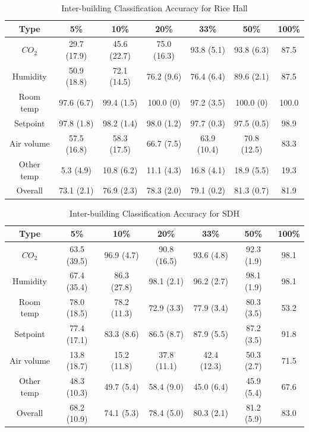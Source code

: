 \begin{table}[ht!]
\caption{Inter-building Classification Accuracy for Rice Hall}
\centering %
\begin{tabular}{c | c | c | c | c | c | c}%
\hline %
Type & 5\% & 10\% & 20\% & 33\% & 50\% & 100\% \\ %
\hline\hline %
$CO_{2}$ & 29.7 (17.9) & 45.6 (22.7) & 75.0 (16.3) & 93.8 (5.1) & 93.8 (6.3) & 87.5\\ \hline
Humidity & 50.9 (18.8) & 72.1 (14.5) & 76.2 (9.6) & 76.4 (6.4) & 89.6 (2.1) & 87.5\\ \hline
Room temp & 97.6 (6.7) & 99.4 (1.5) & 100.0 (0) & 97.2 (3.5) & 100.0 (0) & 100.0\\ \hline
Setpoint & 97.8 (1.8) & 98.2 (1.4) & 98.0 (1.2) & 97.7 (0.3) & 97.5 (0.5) & 98.9\\ \hline
Air volume & 57.5 (16.8) & 58.3 (17.5) & 66.7 (7.5) & 63.9 (10.4) & 70.8 (12.5) & 83.3\\ \hline
Other temp & 5.3 (4.9) & 10.8 (6.2) & 11.1 (4.3) & 16.8 (4.1) & 18.9 (5.5) & 19.3\\ \hline
Overall & 73.1 (2.1) & 76.9 (2.3) & 78.3 (2.0) & 79.1 (0.2) & 81.3 (0.7) & 81.9\\ \hline
\end{tabular}
\label{table:rice_x} %
\end{table}

\begin{table}[ht!]
\caption{Inter-building Classification Accuracy for SDH}
\centering %
\begin{tabular}{c | c | c | c | c | c | c} \hline
Type & 5\% & 10\% & 20\% & 33\% & 50\% & 100\%\\ %
\hline\hline %
$CO_{2}$ & 63.5 (39.5) & 96.9 (4.7) & 90.8 (16.5) & 93.6 (4.8) & 92.3 (1.9) & 98.1\\ \hline
Humidity & 67.4 (35.4) & 86.3 (27.8) & 98.1 (2.1) & 96.2 (2.7) & 98.1 (1.9) & 98.1\\ \hline
Room temp & 78.0 (18.5) & 78.2 (11.3) & 72.9 (3.3) & 77.9 (3.4) & 80.3 (3.5) & 53.2\\ \hline
Setpoint & 77.4 (17.1) & 83.3 (8.6) & 86.5 (8.7) & 87.9 (5.5) & 87.2 (3.5) & 91.8\\ \hline
Air volume & 13.8 (18.7) & 15.2 (11.8) & 37.8 (11.1) & 42.4 (12.3) & 50.3 (2.7) & 71.5\\ \hline
Other temp & 48.3 (10.3) & 49.7 (5.4) & 58.4 (9.0) & 45.0 (6.4) & 45.9 (5.4) & 67.6\\ \hline
Overall & 68.2 (10.9) & 74.1 (5.3) & 78.4 (5.0) & 80.3 (2.1) & 81.2 (5.9) & 83.0\\ \hline
\end{tabular}
\label{table:sdh_x} %
\end{table}

